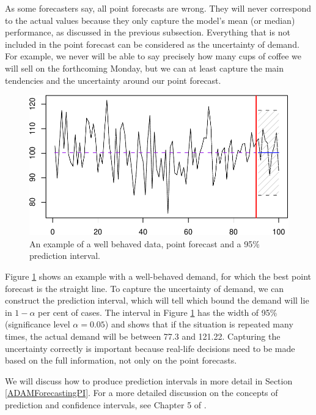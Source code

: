 \documentclass[
]{book}
\theoremstyle{definition}
\theoremstyle{definition}
\theoremstyle{definition}
\theoremstyle{definition}
\theoremstyle{remark}
\begin{document}
As some forecasters say, all point forecasts are wrong. They will never correspond to the actual values because they only capture the model's mean (or median) performance, as discussed in the previous subsection. Everything that is not included in the point forecast can be considered as the uncertainty of demand. For example, we never will be able to say precisely how many cups of coffee we will sell on the forthcoming Monday, but we can at least capture the main tendencies and the uncertainty around our point forecast.

\begin{figure}
\centering
\includegraphics{Svetunkov--2022----ADAM_files/figure-latex/adamExampleNormal-1.pdf}
\caption{\label{fig:adamExampleNormal}An example of a well behaved data, point forecast and a 95\% prediction interval.}
\end{figure}

Figure \ref{fig:adamExampleNormal} shows an example with a well-behaved demand, for which the best point forecast is the straight line. To capture the uncertainty of demand, we can construct the prediction interval, which will tell which bound the demand will lie in \(1-\alpha\) per cent of cases. The interval in Figure \ref{fig:adamExampleNormal} has the width of 95\% (significance level \(\alpha=0.05\)) and shows that if the situation is repeated many times, the actual demand will be between 77.3 and 121.22. Capturing the uncertainty correctly is important because real-life decisions need to be made based on the full information, not only on the point forecasts.

We will discuss how to produce prediction intervals in more detail in Section \ref{ADAMForecastingPI}. For a more detailed discussion on the concepts of prediction and confidence intervals, see Chapter 5 of \citet{SvetunkovSBA}.
\end{document}
